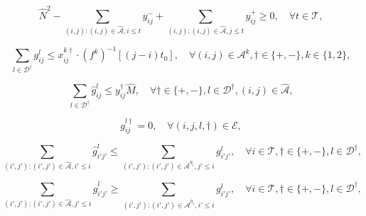 \documentclass[10pt, reqno]{amsart}
\begin{document}
\begin{equation}
 \hat{N}^2-\sum_{(i,j) : (i,j) \in \hat{\mathcal{A}}, i \le t} y_{ij}^- + \sum_{(i,j) : (i,j) \in \hat{\mathcal{A}}, j \le t} y_{ij}^+  \ge 0, \quad \forall t \in \mathcal{T},\label{bal auto -}
\end{equation}

\begin{equation}
\sum_{l \in \mathcal{D}^{\dagger}} g_{ij}^l \le x_{ij}^{k\dagger} \cdot (f^k)^{-1} [(j-i) t_0], \quad \forall (i,j) \in \mathcal{A}^k, \dagger \in \{+,-\}, k \in \{1,2\},\label{BHH}
\end{equation}

\begin{equation}
\sum_{l\in\mathcal{D}^{\dagger}}\hat{g}_{ij}^l \le y_{ij}^{\dagger} \hat{M}, \quad \forall \dagger \in \{+,-\}, l \in \mathcal{D}^{\dagger}, (i,j) \in \hat{\mathcal{A}},\label{auto vol}
\end{equation}

\begin{equation}
g_{ij}^{l\dagger} = 0, \quad \forall (i,j,l,\dagger) \in \mathcal{E},\label{violate}
\end{equation}

\begin{equation}
\sum_{(i',j') : (i',j') \in \hat{\mathcal{A}}, i' \le i} \hat{g}_{i'j'}^l \le \sum_{(i',j') : (i',j') \in \mathcal{A}^{\eta_{\dagger}}, j' \le i} g_{i'j'}^l, \quad \forall i \in \mathcal{T}, \dagger \in \{+,-\}, l \in \mathcal{D}^{\dagger},\label{transfer step 1}
\end{equation}

\begin{equation}
\sum_{(i',j') : (i',j') \in \hat{\mathcal{A}}, j' \le i} \hat{g}_{i'j'}^l \ge \sum_{(i',j') : (i',j') \in \mathcal{A}^{\bar{\eta}_{\dagger}}, i' \le i} g_{i'j'}^l, \quad \forall i \in \mathcal{T}, \dagger \in \{+,-\}, l \in \mathcal{D}^{\dagger},\label{transfer step 2}
\end{equation}
\end{document}
